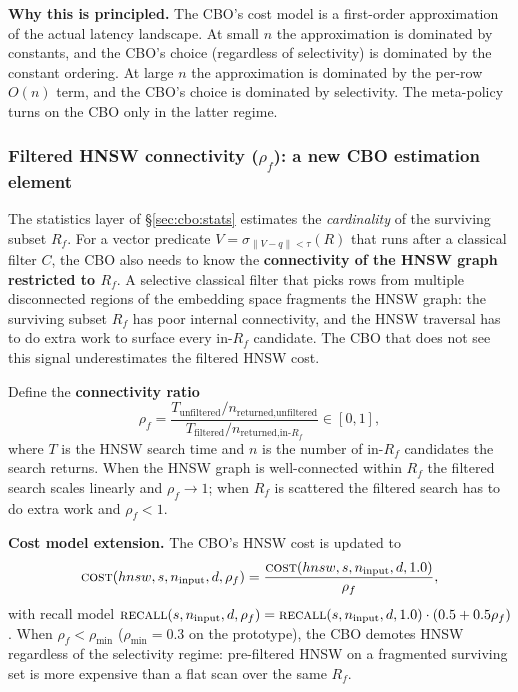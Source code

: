 \documentclass[sigconf,nonacm,review]{acmart}
\theoremstyle{plain}
\theoremstyle{definition}
\theoremstyle{remark}
\begin{document}
\noindent\textbf{Why this is principled.} The CBO's cost
model is a first-order approximation of the actual latency
landscape. At small $n$ the approximation is dominated by
constants, and the CBO's choice (regardless of
selectivity) is dominated by the constant ordering. At
large $n$ the approximation is dominated by the per-row
$O(n)$ term, and the CBO's choice is dominated by
selectivity. The meta-policy turns on the CBO only in the
latter regime.

\subsubsection{Filtered HNSW connectivity ($\rho_f$): a new CBO estimation element}\label{sec:cbo:rho}

The statistics layer of \S\ref{sec:cbo:stats} estimates the
\emph{cardinality} of the surviving subset $R_f$. For a vector
predicate $V = \sigma_{\|V - q\| < \tau}(R)$ that runs after a
classical filter $C$, the CBO also needs to know the
\textbf{connectivity of the HNSW graph restricted to $R_f$}.
A selective classical filter that picks rows from multiple
disconnected regions of the embedding space fragments the
HNSW graph: the surviving subset $R_f$ has poor internal
connectivity, and the HNSW traversal has to do extra work
to surface every in-$R_f$ candidate. The CBO that does not
see this signal underestimates the filtered HNSW cost.

Define the \textbf{connectivity ratio}
\begin{equation}
  \rho_f = \frac{T_{\text{unfiltered}} / n_{\text{returned,unfiltered}}}
                {T_{\text{filtered}} / n_{\text{returned,in-}R_f}}
  \in [0, 1],
\end{equation}
where $T$ is the HNSW search time and $n$ is the number of
in-$R_f$ candidates the search returns. When the HNSW graph
is well-connected within $R_f$ the filtered search scales
linearly and $\rho_f \to 1$; when $R_f$ is scattered the
filtered search has to do extra work and $\rho_f < 1$.

\noindent\textbf{Cost model extension.} The CBO's
HNSW cost is updated to
\begin{equation}
  \Call{cost}{hnsw, s, n_{\text{input}}, d, \rho_f} = \frac{\Call{cost}{hnsw, s, n_{\text{input}}, d, 1.0}}{\rho_f},
\end{equation}
with recall model
$\Call{recall}{s, n_{\text{input}}, d, \rho_f} =
  \Call{recall}{s, n_{\text{input}}, d, 1.0} \cdot (0.5 + 0.5 \rho_f)$.
When $\rho_f < \rho_{\min}$ ($\rho_{\min} = 0.3$ on the
prototype), the CBO demotes HNSW regardless of the
selectivity regime: pre-filtered HNSW on a fragmented
surviving set is more expensive than a flat scan over the
same $R_f$.
\end{document}
